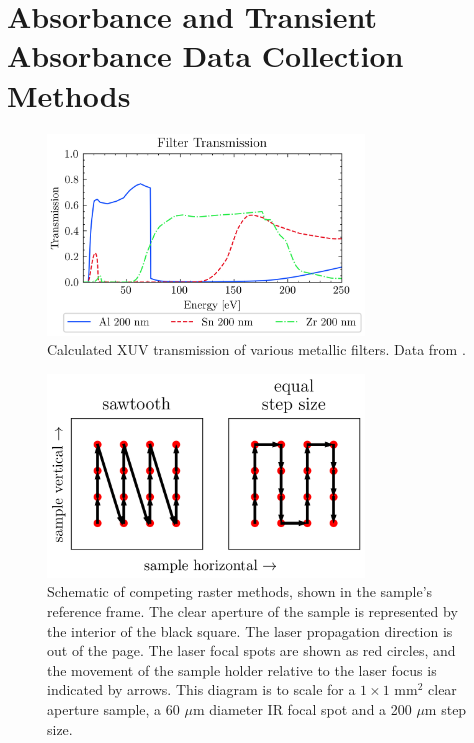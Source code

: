 \section{Absorbance and Transient Absorbance Data Collection Methods}

\begin{figure}
	\centering
	\includegraphics[width=0.75\textwidth]{figures/chap3/Filter_transmission_CXRO.png}
	\caption{Calculated XUV transmission of various metallic filters. Data from \cite{gulliksonCXROXRayInteractions}.}
	\label{fig:Filter_transmission_CXRO}
\end{figure}

\begin{figure}
	\centering
	\includegraphics[width=0.75\textwidth]{figures/chap3/Rastering_Methods.png}
	\caption{Schematic of competing raster methods, shown in the sample's reference frame. The clear aperture of the sample is represented by the interior of the black square. The laser propagation direction is out of the page. The laser focal spots are shown as red circles, and the movement of the sample holder relative to the laser focus is indicated by arrows. This diagram is to scale for a $1\times1$ mm$^2$ clear aperture sample, a 60 $\mu$m diameter IR focal spot and a 200 $\mu$m step size.}
	\label{fig:Rastering_Methods}
\end{figure}


